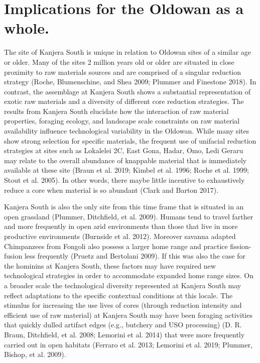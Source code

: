 \documentclass[]{elsarticle} %
\begin{document}
\hypertarget{implications-for-the-oldowan-as-a-whole.}{%
\section{Implications for the Oldowan as a
whole.}\label{implications-for-the-oldowan-as-a-whole.}}

The site of Kanjera South is unique in relation to Oldowan sites of a
similar age or older. Many of the sites 2 million years old or older are
situated in close proximity to raw materials sources and are comprised
of a singular reduction strategy (Roche, Blumenschine, and Shea 2009;
Plummer and Finestone 2018). In contrast, the assemblage at Kanjera
South shows a substantial representation of exotic raw materials and a
diversity of different core reduction strategies. The results from
Kanjera South elucidate how the interaction of raw material properties,
foraging ecology, and landscape scale constraints on raw material
availability influence technological variability in the Oldowan. While
many sites show strong selection for specific materials, the frequent
use of unifacial reduction strategies at sites such as Lokalelei 2C,
East Gona, Hadar, Omo, Ledi Geraru may relate to the overall abundance
of knappable material that is immediately available at these site (Braun
et al. 2019; Kimbel et al. 1996; Roche et al. 1999; Stout et al. 2005).
In other words, there maybe little incentive to exhaustively reduce a
core when material is so abundant (Clark and Barton 2017).

Kanjera South is also the only site from this time frame that is
situated in an open grassland (Plummer, Ditchfield, et al. 2009). Humans
tend to travel farther and more frequently in open arid environments
than those that live in more productive environments (Burnside et al.
2012). Moreover savanna adapted Chimpanzees from Fongoli also possess a
larger home range and practice fission-fusion less frequently (Pruetz
and Bertolani 2009). If this was also the case for the hominins at
Kanjera South, these factors may have required new technological
strategies in order to accommodate expanded home range sizes. On a
broader scale the technological diversity represented at Kanjera South
may reflect adaptations to the specific contextual conditions at this
locale. The stimulus for increasing the use lives of cores (through
reduction intensity and efficient use of raw material) at Kanjera South
may have been foraging activities that quickly dulled artifact edges
(e.g., butchery and USO processing) (D. R. Braun, Ditchfield, et al.
2008; Lemorini et al. 2014) that were more frequently carried out in
open habitats (Ferraro et al. 2013; Lemorini et al. 2019; Plummer,
Bishop, et al. 2009).
\end{document}
